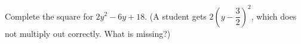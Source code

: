 Complete the square for $2y^2-6y+18$. (A student gets $2\left(y-\dfrac{3}{2}\right)^2$, which does not multiply out correctly. What is missing?)

